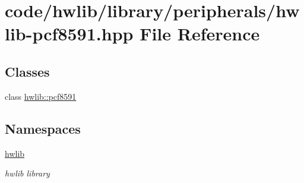 \hypertarget{hwlib-pcf8591_8hpp}{}\section{code/hwlib/library/peripherals/hwlib-\/pcf8591.hpp File Reference}
\label{hwlib-pcf8591_8hpp}
\subsection*{Classes}
\begin{DoxyCompactItemize}
\item 
class \hyperlink{classhwlib_1_1pcf8591}{hwlib\+::pcf8591}
\end{DoxyCompactItemize}
\subsection*{Namespaces}
\begin{DoxyCompactItemize}
\item 
 \hyperlink{namespacehwlib}{hwlib}
\begin{DoxyCompactList}\small\item\em hwlib library \end{DoxyCompactList}\end{DoxyCompactItemize}
